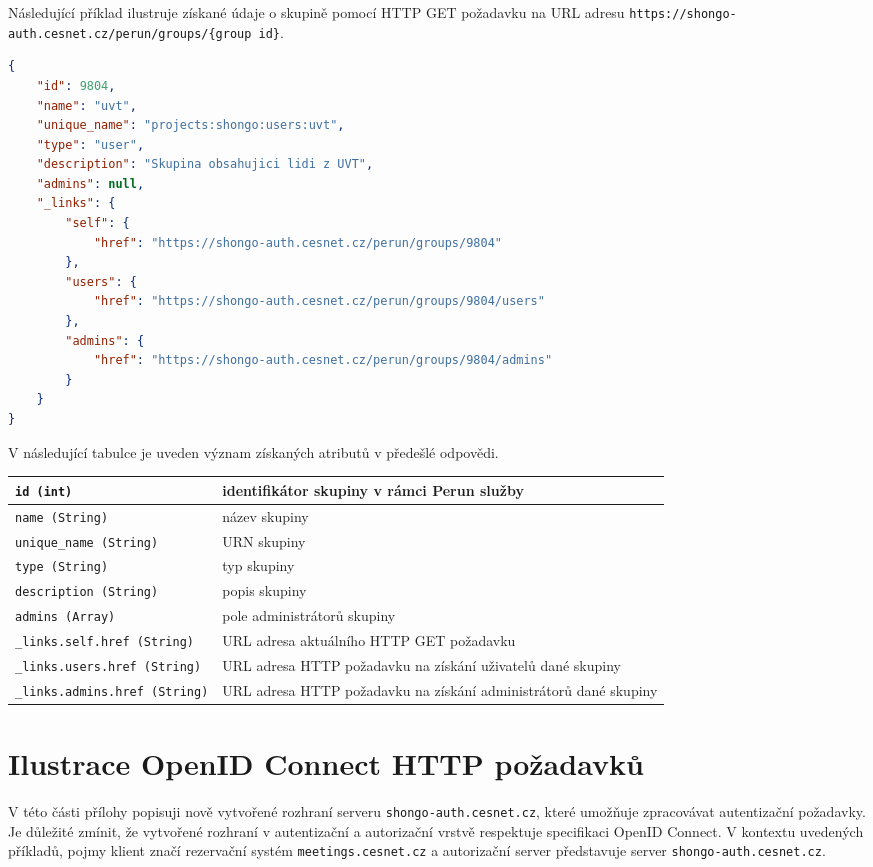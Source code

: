 \documentclass[
  printed, %
  twoside, %
  table,   %
  nolof,     %
  nolot,     %
]{fithesis3}
\begin{document}
Následující příklad ilustruje získané údaje o skupině pomocí HTTP GET požadavku na URL adresu \texttt{https://shongo-auth.cesnet.cz/perun/groups/\{group id\}}.

\begin{lstlisting}[language=json,firstnumber=1]
{
    "id": 9804,
    "name": "uvt",
    "unique_name": "projects:shongo:users:uvt",
    "type": "user",
    "description": "Skupina obsahujici lidi z UVT",
    "admins": null,
    "_links": {
        "self": {
            "href": "https://shongo-auth.cesnet.cz/perun/groups/9804"
        },
        "users": {
            "href": "https://shongo-auth.cesnet.cz/perun/groups/9804/users"
        },
        "admins": {
            "href": "https://shongo-auth.cesnet.cz/perun/groups/9804/admins"
        }
    }
}
\end{lstlisting}

V následující tabulce je uveden význam získaných atributů v předešlé odpovědi. 

\begin{table}[H]
\begin{tabular}{|l|l|}
\hline
\texttt{id (int)}                       & \parbox[t]{6cm}{identifikátor skupiny v rámci Perun služby}  \\ \hline
\texttt{name (String)}                  & název skupiny  \\ \hline
\texttt{unique\_name (String)}          & URN skupiny  \\ \hline
\texttt{type (String)}                  &  typ skupiny \\ \hline
\texttt{description (String)}           & popis skupiny  \\ \hline
\texttt{admins (Array)}                 & pole administrátorů skupiny  \\ \hline
\texttt{\_links.self.href (String)}     & \parbox[t]{6cm}{URL adresa aktuálního HTTP GET požadavku}  \\ \hline
\texttt{\_links.users.href (String)}    & \parbox[t]{6cm}{URL adresa HTTP požadavku na získání uživatelů dané skupiny}  \\ \hline
\texttt{\_links.admins.href (String)}   & \parbox[t]{6cm}{URL adresa HTTP požadavku na získání administrátorů dané skupiny}  \\ \hline


\end{tabular}
\end{table}

\chapter{Ilustrace OpenID Connect HTTP požadavků}
\label{oidcEndpoints}
V této části přílohy popisuji nově vytvořené rozhraní serveru \texttt{shongo-auth.cesnet.cz}, které umožňuje zpracovávat autentizační požadavky. Je důležité zmínit, že vytvořené rozhraní v autentizační a autorizační vrstvě respektuje specifikaci OpenID Connect. V kontextu uvedených příkladů, pojmy klient značí rezervační systém \texttt{meetings.cesnet.cz} a autorizační server představuje server \texttt{shongo-auth.cesnet.cz}.
\end{document}
